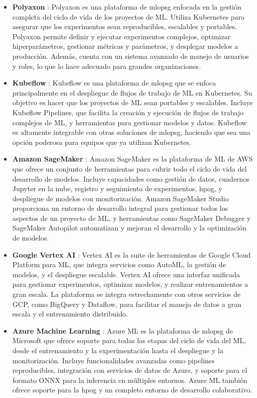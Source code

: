 \begin{itemize}
    \item \textbf{Polyaxon} \cite{polyaxon}: Polyaxon es una plataforma de \Gls{mlopsg} enfocada en la gestión completa del ciclo de vida de los proyectos de ML. Utiliza Kubernetes para asegurar que los experimentos sean reproducibles, escalables y portables. Polyaxon permite definir y ejecutar experimentos complejos, optimizar hiperparámetros, gestionar métricas y parámetros, y desplegar modelos a producción. Además, cuenta con un sistema avanzado de manejo de usuarios y roles, lo que lo hace adecuado para grandes organizaciones.

    \item \textbf{Kubeflow} \cite{kubeflow}: Kubeflow es una plataforma de \Gls{mlopsg} que se enfoca principalmente en el despliegue de flujos de trabajo de ML en Kubernetes. Su objetivo es hacer que los proyectos de ML sean portables y escalables. Incluye Kubeflow Pipelines, que facilita la creación y ejecución de flujos de trabajo complejos de ML, y herramientas para gestionar modelos y datos. Kubeflow es altamente integrable con otras soluciones de \Gls{mlopsg}, haciendo que sea una opción poderosa para equipos que ya utilizan Kubernetes.

    \item \textbf{Amazon SageMaker} \cite{sagemaker}: Amazon SageMaker es la plataforma de ML de AWS que ofrece un conjunto de herramientas para cubrir todo el ciclo de vida del desarrollo de modelos. Incluye capacidades como gestión de datos, cuadernos Jupyter en la nube, registro y seguimiento de experimentos, \gls{hpog}, y despliegue de modelos con monitorización. Amazon SageMaker Studio proporciona un entorno de desarrollo integral para gestionar todos los aspectos de un proyecto de ML, y herramientas como SageMaker Debugger y SageMaker Autopilot automatizan y mejoran el desarrollo y la optimización de modelos.

    \item \textbf{Google Vertex AI} \cite{vertexai}: Vertex AI es la suite de herramientas de Google Cloud Platform para ML, que integra servicios como AutoML, la gestión de modelos, y el despliegue escalable. Vertex AI ofrece una interfaz unificada para gestionar experimentos, optimizar modelos, y realizar entrenamientos a gran escala. La plataforma se integra estrechamente con otros servicios de GCP, como BigQuery y Dataflow, para facilitar el manejo de datos a gran escala y el entrenamiento distribuido.

    \item \textbf{Azure Machine Learning} \cite{azure}: Azure ML es la plataforma de \Gls{mlopsg} de Microsoft que ofrece soporte para todas las etapas del ciclo de vida del ML, desde el entrenamiento y la experimentación hasta el despliegue y la monitorización. Incluye funcionalidades avanzadas como pipelines reproducibles, integración con servicios de datos de Azure, y soporte para el formato ONNX para la inferencia en múltiples entornos. Azure ML también ofrece soporte para la \gls{hpog} y un completo entorno de desarrollo colaborativo.


\end{itemize}
